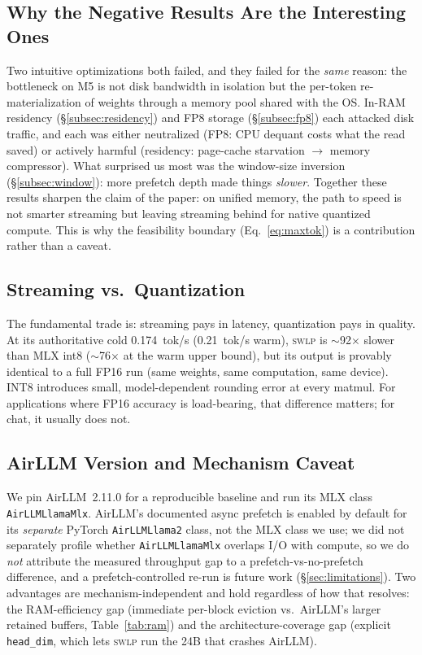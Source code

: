\documentclass[10pt,a4paper]{article}
\newcommand{\swlp}{\textsc{swlp}}
\begin{document}
\subsection{Why the Negative Results Are the Interesting Ones}
\label{subsec:why-negative}
Two intuitive optimizations both failed, and they failed for the \emph{same}
reason: the bottleneck on M5 is not disk bandwidth in isolation but the
per-token re-materialization of weights through a memory pool shared with the OS.
In-RAM residency (\S\ref{subsec:residency}) and FP8 storage (\S\ref{subsec:fp8})
each attacked disk traffic, and each was either neutralized (FP8: CPU dequant
costs what the read saved) or actively harmful (residency: page-cache starvation
$\to$ memory compressor). What surprised us most was the window-size inversion
(\S\ref{subsec:window}): more prefetch depth made things \emph{slower}. Together
these results sharpen the claim of the paper: on unified memory, the path to
speed is not smarter streaming but leaving streaming behind for native quantized
compute. This is why the feasibility boundary (Eq.~\ref{eq:maxtok}) is a contribution
rather than a caveat.

\subsection{Streaming vs.\ Quantization}
\label{subsec:tradeoff}
The fundamental trade is: streaming pays in latency, quantization pays in quality.
At its authoritative cold 0.174~tok/s (0.21~tok/s warm), \swlp{} is
$\sim$92$\times$ slower than MLX int8 ($\sim$76$\times$ at the warm upper bound),
but its output is
provably identical to a full FP16 run (same weights, same computation, same
device). INT8 introduces small, model-dependent rounding error at every matmul.
For applications where FP16 accuracy is load-bearing, that difference matters; for
chat, it usually does not.

\subsection{AirLLM Version and Mechanism Caveat}
\label{subsec:prefetch-note}
We pin AirLLM~2.11.0 for a reproducible baseline and run its MLX class
\texttt{AirLLMLlamaMlx}. AirLLM's documented async prefetch is enabled by default
for its \emph{separate} PyTorch \texttt{AirLLMLlama2} class, not the MLX class we
use; we did not separately profile whether \texttt{AirLLMLlamaMlx} overlaps I/O
with compute, so we do \emph{not} attribute the measured throughput gap to a
prefetch-vs-no-prefetch difference, and a prefetch-controlled re-run is future
work (\S\ref{sec:limitations}). Two advantages are mechanism-independent and hold
regardless of how that resolves: the RAM-efficiency gap (immediate per-block
eviction vs.\ AirLLM's larger retained buffers, Table~\ref{tab:ram}) and the
architecture-coverage gap (explicit \texttt{head\_dim}, which lets \swlp{} run the
24B that crashes AirLLM).
\end{document}
